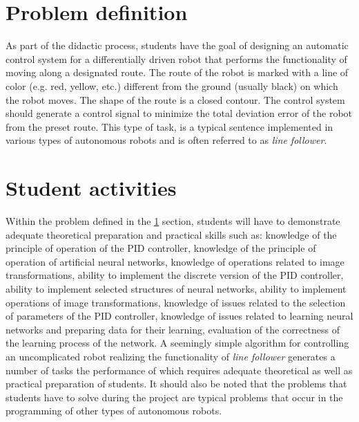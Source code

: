 \documentclass[conference]{IEEEtran}
\begin{document}

\section{Problem definition}\label{sec:problem-definition}
As part of the didactic process, students have the goal of designing an automatic control system for a differentially driven robot that performs the functionality of moving along a designated route. The route of the robot is marked with a line of color (e.g. red, yellow, etc.) different from the ground (usually black) on which the robot moves. The shape of the route is a closed contour. The control system should generate a control signal to minimize the total deviation error of the robot from the preset route.  This type of task, is a typical sentence implemented in various types of autonomous robots and is often referred to as \emph{line follower}.  


\section{Student activities}\label{sec:student-activity}
Within the problem defined in the \ref{sec:problem-definition} section, students will have to demonstrate adequate theoretical preparation and practical skills such as: 
knowledge of the principle of operation of the PID controller, knowledge of the principle of operation of artificial neural networks, knowledge of operations related to image transformations, ability to implement the discrete version of the PID controller, ability to implement selected structures of neural networks, ability to implement operations of image transformations, knowledge of issues related to the selection of parameters of the PID controller, knowledge of issues related to learning neural networks and preparing data for their learning, evaluation of the correctness of the learning process of the network. A seemingly simple algorithm for controlling an uncomplicated robot realizing the functionality of \emph{line follower} generates a number of tasks the performance of which requires adequate theoretical as well as practical preparation of students. It should also be noted that the problems that students have to solve during the project are typical problems that occur in the programming of other types of autonomous robots.

\end{document}
